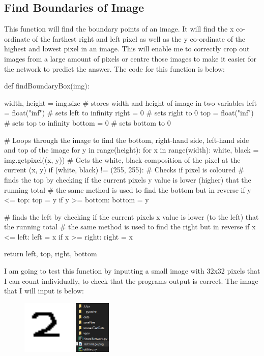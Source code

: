 \documentclass{report}
\begin{document}
\subsection{Find Boundaries of Image}
This function will find the boundary points of an image. It will find the x co-ordinate of the farthest right and left pixel as well as the y co-ordinate of the highest and lowest pixel in an image. This will enable me to correctly crop out images from a large amount of pixels or centre those images to make it easier for the network to predict the answer. The code for this function is below:
\begin{python}
def findBoundaryBox(img):

    width, height = img.size  # stores width and height of image in two variables
    left = float("inf")  # sets left to infinity
    right = 0  # sets right to 0
    top = float("inf")  # sets top to infinity
    bottom = 0  # sets bottom to 0

    # Loops through the image to find the bottom, right-hand side, left-hand side and top of the image
    for y in range(height):
        for x in range(width):
            white, black = img.getpixel((x, y))  # Gets the white, black composition of the pixel at the current (x, y)
            if (white, black) != (255, 255):  # Checks if pixel is coloured
                # finds the top by checking if the current pixels y value is lower (higher) that the running total
                # the same method is used to find the bottom but in reverse
                if y <= top:
                    top = y
                if y >= bottom:
                    bottom = y

                # finds the left by checking if the current pixels x value is lower (to the left) that the running total
                # the same method is used to find the right but in reverse
                if x <= left:
                    left = x
                if x >= right:
                    right = x

    return left, top, right, bottom
\end{python}
I am going to test this function by inputting a small image with 32x32 pixels that I can count individually, to check that the programs output is correct. The image that I will input is below:
\begin{figure}[H]
    \centering
    \includegraphics[height = 1in]{Images/Development and Testing/Stage 4/Find Bounding Box Testing/Test Image.png}
    \includegraphics[height = 1in]{Images/Development and Testing/Stage 4/Find Bounding Box Testing/Test Image in File System.png}
    \label{fig:Test Image for Boundary Finder}
\end{figure}
\end{document}
